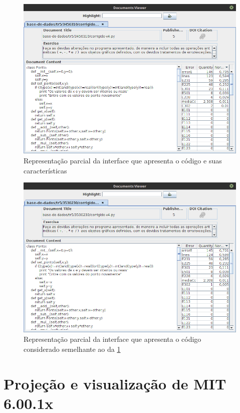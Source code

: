 		\begin{figure}[h]
			\centering
			\includegraphics[width=0.8\linewidth]{imagem/codigo1}
			\caption[Representação parcial da interface que apresenta o código e suas características]
			{Representação parcial da interface que apresenta o código e suas características \cite{Alencar-etal:2012}}
			\label{fig:codigo1}
		\end{figure}
		
		\begin{figure}[H]
			\centering
			\includegraphics[width=0.8\linewidth]{imagem/codigo2}
			\caption[Representação parcial da interface que apresenta o código considerado semelhante ao da \cref{fig:codigo1}]
			{Representação parcial da interface que apresenta o código considerado semelhante ao da \cref{fig:codigo1} \cite{Alencar-etal:2012}}
			\label{fig:codigo2}
		\end{figure}
	
	
	\section{Projeção e visualização de MIT 6.00.1x}	

